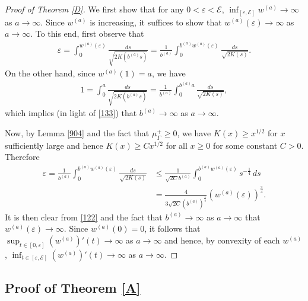 \documentclass[12pt]{article}
\numberwithin{equation}{section}
\theoremstyle{plain}
\theoremstyle{definition}
\newcommand{\ep}{\varepsilon}
\begin{document}
	\begin{proof}[Proof of Theorem \ref{D}]
	We first show that for any $0<\ep<\mathcal{E}$, $\inf_{[\ep,\mathcal{E}]}w^{(a)}\rightarrow \infty$ as $a\rightarrow\infty$. Since $w^{(a)}$ is increasing, it suffices to show that $w^{(a)}(\ep) \rightarrow \infty$ as $a\rightarrow\infty$.  To this end, first observe that
	\begin{align*}
	\ep= \int_0^{w^{(a)}(\ep)} \frac{ds}{\sqrt{2K(b^{(a)}s)}} = \frac{1}{b^{(a)}}\int_0^{b^{(a)}w^{(a)}(\ep)} \frac{ds}{\sqrt{2K(s)}}.
	\end{align*}
On the other hand, since $w^{(a)}(1) = a$, we have
\begin{align*}
1 = \int_0^a  \frac{ds}{\sqrt{2K(b^{(a)}s)}} = \frac{1}{b^{(a)}}\int_0^{b^{(a)}a} \frac{ds}{\sqrt{2K(s)}},
\end{align*}
which implies (in light of \eqref{133}) that $b^{(a)}\rightarrow\infty$ as $a\rightarrow\infty$. \medskip 

Now, by Lemma \ref{904} and the fact that $\mu_\Gamma^+ \geq 0$, we have $K(x) \geq x^{1/2}$ for $x$ sufficiently large and hence $K(x) \geq Cx^{1/2}$ for all $x \geq 0$ for some constant $C>0$. Therefore
	\begin{align}\label{122}
	\ep  = \frac{1}{b^{(a)}}\int_0^{b^{(a)} w^{(a)}(\ep)} \frac{ds}{\sqrt{2K(s)}} & \leq  \frac{1}{\sqrt{2C}b^{(a)}}\int_0^{b^{(a)} w^{(a)}(\ep)} s^{-\frac{1}{4}}\,ds  \nonumber \\
	& = \frac{4}{3\sqrt{2C}(b^{(a)})^\frac{1}{4}} (w^{(a)}(\ep))^{\frac{3}{4}}.
	\end{align}
	It is then clear from \eqref{122} and the fact that $b^{(a)}\rightarrow\infty$ as $a\rightarrow \infty$ that $w^{(a)}(\ep)\rightarrow\infty$. Since $w^{(a)}(0) = 0$, it follows that $\sup_{t\in[0,\ep]} (w^{(a)})'(t) \rightarrow\infty$ as $a\rightarrow\infty$ and hence, by convexity of each $w^{(a)}$, $\inf_{t\in[\ep,\mathcal{E}]} (w^{(a)})'(t)\rightarrow\infty$ as $a\rightarrow\infty$. 
\end{proof} 






\subsection{Proof of Theorem \ref{A}}\label{s5}
\end{document}
